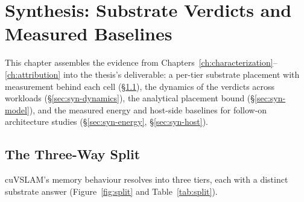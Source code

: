 \chapter{Synthesis: Substrate Verdicts and Measured Baselines}
\label{ch:synthesis}

This chapter assembles the evidence from Chapters~\ref{ch:characterization}--\ref{ch:attribution} into the thesis's deliverable: a per-tier substrate placement with measurement behind each cell (\S\ref{sec:syn-split}), the dynamics of the verdicts across workloads (\S\ref{sec:syn-dynamics}), the analytical placement bound (\S\ref{sec:syn-model}), and the measured energy and host-side baselines for follow-on architecture studies (\S\ref{sec:syn-energy}, \S\ref{sec:syn-host}).

\section{The Three-Way Split}
\label{sec:syn-split}

cuVSLAM's memory behaviour resolves into three tiers, each with a distinct substrate answer (Figure~\ref{fig:split} and Table~\ref{tab:split}).

